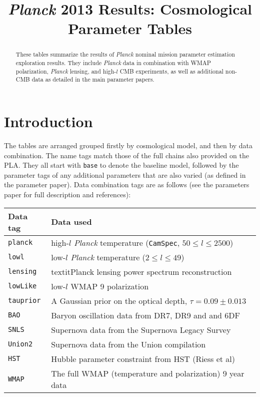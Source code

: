 \title{\textit{Planck} 2013 Results: Cosmological Parameter Tables}


\maketitle
\begin{abstract}
These tables summarize the results of \textit{Planck} nominal mission parameter estimation exploration results. They include \textit{Planck}  data in combination with WMAP polarization, \textit{Planck} lensing, and high-$l$ CMB experiments, as well as additional non-CMB data as detailed in the main parameter papers.
\end{abstract}

\newpage
\section{Introduction}

The tables are arranged grouped firstly by cosmological model, and then by data combination. The name tags match those of the full chains also provided on the PLA. They all start with {\tt base} to denote the baseline model, followed by the parameter tags of any additional parameters that are also varied (as defined in the parameter paper). Data combination tags are as follows (see the parameters paper for full description and references):

\begin{tabular} { l   l  }
Data tag & Data used\\
\hline
{\tt planck}         & high-$l$ \textit{Planck}  temperature ({\tt CamSpec}, $50\le l\le 2500$) \\
{\tt lowl }          & low-$l$ \textit{Planck}  temperature ($2\le l \le 49$)  \\
{\tt lensing}        & textit{Planck}  lensing power spectrum reconstruction \\
{\tt lowLike}        & low-$l$ WMAP 9 polarization \\
{\tt tauprior}       & A Gaussian prior on the optical depth, $\tau = 0.09 \pm 0.013$ \\
{\tt BAO}            & Baryon oscillation data from DR7, DR9 and and 6DF \\
{\tt SNLS}           & Supernova data from the Supernova Legacy Survey \\
{\tt Union2}         & Supernova data from the Union compilation \\
{\tt HST}            & Hubble parameter constraint from HST (Riess et al) \\
{\tt WMAP}           & The full WMAP (temperature and polarization) 9 year data \\
\hline
\end{tabular}
\vskip 1cm


